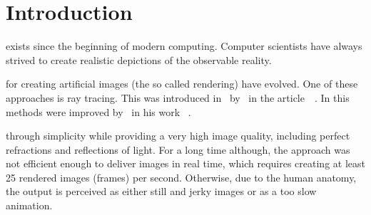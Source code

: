 \documentclass[%
    a4paper,    %
    justified,  %
    nobib,      %
    openany     %
]{tufte-book}
\makeatletter
\renewcommand{\label}[1]{\@tufte@label{##1}}%
\makeatother
\begin{document}
\newpage{}

\chapter{Introduction}
\label{chap:introduction}


 exists since the
beginning of modern computing. Computer scientists have always strived to create
realistic depictions of the observable reality.

 for creating artificial images (the so
called rendering) have evolved. One of these approaches is ray tracing. This was
introduced in~\citeyear{appel_techniques_1968}
by~ in the
article~~\cite{appel_techniques_1968}. In
\citeyear{whitted_improved_1980} this methods were improved
by~ in his work
~\cite{whitted_improved_1980}.

 through simplicity while providing a very
high image quality, including perfect refractions and reflections of light. For
a long time although, the approach was not efficient enough to deliver images in
real time, which requires creating at least 25 rendered images (frames) per
second. Otherwise, due to the human anatomy, the output is perceived as either
still and jerky images or as a too slow animation.
\end{document}
